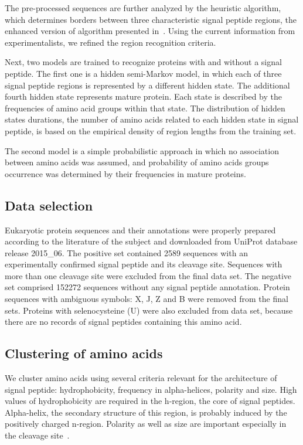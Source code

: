 \documentclass[fleqn,10pt,twoside]{gcb15submission}
\begin{document}
The pre-processed sequences are further analyzed by the heuristic algorithm, which determines borders between three characteristic signal peptide regions, the enhanced version of algorithm presented in~\cite{1998nielsenprediction}. Using the current information from experimentalists, we refined the region recognition criteria.

Next, two models are trained to recognize proteins with and without a signal peptide. The first one is a hidden semi-Markov model, in which each of three signal peptide regions is represented by a different hidden state. The additional fourth hidden state represents mature protein. Each state is described by the frequencies of amino acid groups  within that state. The distribution of hidden states durations, the number of amino acids related to each hidden state in signal peptide, is based on the empirical density of region lengths from the training set. 

The second model is a simple probabilistic approach in which no association between amino acids was assumed, and probability of amino acids groups occurrence was determined by their frequencies in mature proteins.

\subsection*{Data selection}

Eukaryotic protein sequences and their annotations were properly prepared according to the literature of the subject and downloaded from UniProt database release 2015\_06. The positive set contained 2589 sequences with an experimentally confirmed signal peptide and its cleavage site. Sequences with more than one cleavage site were excluded from the final data set. The negative set comprised 152272 sequences without any signal peptide annotation. Protein sequences with ambiguous symbols: X, J, Z and B were removed from the final sets. Proteins with selenocysteine (U) were also excluded from data set, because there are no records of signal peptides containing this amino acid.

\subsection*{Clustering of amino acids}

We cluster amino acids using several criteria relevant for the architecture of signal peptide: hydrophobicity, frequency in alpha-helices, polarity and size. High values of hydrophobicity are required in the h-region, the core of signal peptides. Alpha-helix, the secondary structure of this region, is probably induced by the positively charged n-region. Polarity as well as size are important especially in the cleavage site~\citep{1994palzkillselection}.
\end{document}
